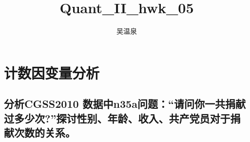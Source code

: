 \documentclass[
]{ctexart}
\title{Quant\_II\_hwk\_05}
\author{吴温泉}
\date{}
\begin{document}
\maketitle

{
\setcounter{tocdepth}{2}
\tableofcontents
}
\hypertarget{ux8ba1ux6570ux56e0ux53d8ux91cfux5206ux6790}{%
\section{计数因变量分析}\label{ux8ba1ux6570ux56e0ux53d8ux91cfux5206ux6790}}

\hypertarget{ux5206ux6790cgss2010-ux6570ux636eux4e2dn35aux95eeux9898ux8bf7ux95eeux4f60ux4e00ux5171ux6350ux732eux8fc7ux591aux5c11ux6b21ux63a2ux8ba8ux6027ux522bux5e74ux9f84ux6536ux5165ux5171ux4ea7ux515aux5458ux5bf9ux4e8eux6350ux732eux6b21ux6570ux7684ux5173ux7cfb}{%
\subsection{分析CGSS2010
数据中n35a问题：``请问你一共捐献过多少次?''探讨性别、年龄、收入、共产党员对于捐献次数的关系。}\label{ux5206ux6790cgss2010-ux6570ux636eux4e2dn35aux95eeux9898ux8bf7ux95eeux4f60ux4e00ux5171ux6350ux732eux8fc7ux591aux5c11ux6b21ux63a2ux8ba8ux6027ux522bux5e74ux9f84ux6536ux5165ux5171ux4ea7ux515aux5458ux5bf9ux4e8eux6350ux732eux6b21ux6570ux7684ux5173ux7cfb}}
\end{document}
